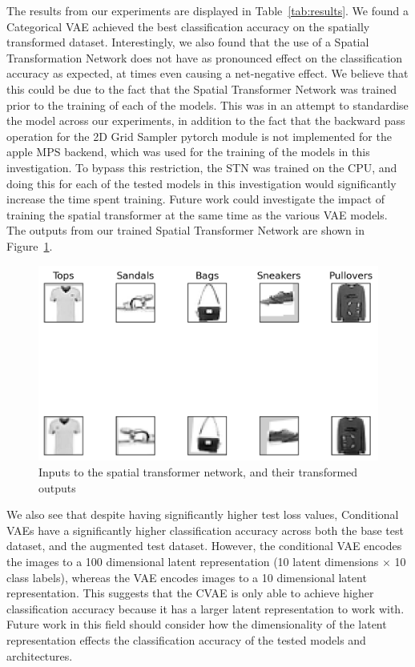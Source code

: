 \documentclass[twocolumn]{article}
\begin{document}
The results from our experiments are displayed in Table~\ref{tab:results}. We found a Categorical VAE achieved the best classification accuracy on the spatially transformed dataset. Interestingly, we also found that the use of a Spatial Transformation Network does not have as pronounced effect on the classification accuracy as expected, at times even causing a net-negative effect. We believe that this could be due to the fact that the Spatial Transformer Network was trained prior to the training of each of the models. This was in an attempt to standardise the model across our experiments, in addition to the fact that the backward pass operation for the 2D Grid Sampler pytorch module is not implemented for the apple MPS backend, which was used for the training of the models in this investigation. To bypass this restriction, the STN was trained on the CPU, and doing this for each of the tested models in this investigation would significantly increase the time spent training. Future work could investigate the impact of training the spatial transformer at the same time as the various VAE models. The outputs from our trained Spatial Transformer Network are shown in Figure~\ref{fig:stn}.

\begin{figure}
    \centering
    \includegraphics[scale=0.5]{../images/stn.png}
    \caption{Inputs to the spatial transformer network, and their transformed outputs}
    \label{fig:stn}
\end{figure}

We also see that despite having significantly higher test loss values, Conditional VAEs have a significantly higher classification accuracy across both the base test dataset, and the augmented test dataset. However, the conditional VAE encodes the images to a 100 dimensional latent representation (10 latent dimensions \(\times\) 10 class labels), whereas the VAE encodes images to a 10 dimensional latent representation. This suggests that the CVAE is only able to achieve higher classification accuracy because it has a larger latent representation to work with. Future work in this field should consider how the dimensionality of the latent representation effects the classification accuracy of the tested models and architectures. 
\end{document}
